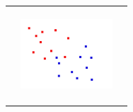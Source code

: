 \begin{frame}
\begin{adjustwidth}{-1.5em}{-1.5em}
\begin{tabular}{lll}
           & \includegraphics[width=130, height=130,keepaspectratio]{fig/inspace.jpg}
    \end{tabular}
    \end{adjustwidth}
\end{frame}


